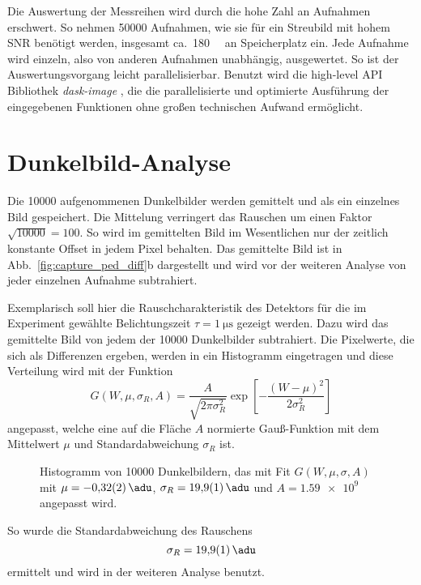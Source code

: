 \noindent
Die Auswertung der Messreihen wird durch die hohe Zahl an Aufnahmen erschwert. So nehmen \num{50000} Aufnahmen, wie sie für ein Streubild mit hohem SNR benötigt werden, insgesamt ca.\ \qty{180}{\giga\byte} an Speicherplatz ein. Jede Aufnahme wird einzeln, also von anderen Aufnahmen unabhängig, ausgewertet. So ist der Auswertungsvorgang leicht parallelisierbar. Benutzt wird die high-level API Bibliothek \textit{dask-image} \cite{dask-library}, die die parallelisierte und optimierte Ausführung der eingegebenen Funktionen ohne großen technischen Aufwand ermöglicht.

\section{Dunkelbild-Analyse}
Die \num{10000} aufgenommenen Dunkelbilder werden gemittelt und als ein einzelnes Bild gespeichert. Die Mittelung verringert das Rauschen um einen Faktor $\sqrt{10000} = 100$. So wird im gemittelten Bild im Wesentlichen nur der zeitlich konstante Offset in jedem Pixel behalten. Das gemittelte Bild ist in Abb.~\ref{fig:capture_ped_diff}b dargestellt und wird vor der weiteren Analyse von jeder einzelnen Aufnahme subtrahiert.

\noindent
Exemplarisch soll hier die Rauschcharakteristik des Detektors für die im Experiment gewählte Belichtungszeit $\tau = \SI{1}{\micro\second}$ gezeigt werden. Dazu wird das gemittelte Bild von jedem der \num{10000} Dunkelbilder subtrahiert. Die Pixelwerte, die sich als Differenzen ergeben, werden in ein Histogramm eingetragen und diese Verteilung wird mit der Funktion
\begin{equation}
    G(W, \mu, \sigma_R, A) = \frac{A}{\sqrt{2\pi \sigma_R^2}}\exp\left[-\frac{(W - \mu)^2}{2\sigma_R^2}\right]
    \label{eq:gauss_funktion}
\end{equation}
angepasst, welche eine auf die Fläche $A$ normierte Gauß-Funktion mit dem Mittelwert $\mu$ und Standardabweichung $\sigma_R$ ist.
\begin{figure}[H]
    \centering
    
    \caption{Histogramm von \num{10000} Dunkelbildern, das mit Fit $G(W,\mu,\sigma, A)$ mit $\mu= \SI{-0.32(2)}{\adu}$, $\sigma_R = \SI{19.9(1)}{\adu}$ und $A = \num{1.59e9}$ angepasst wird.}
    \label{fig:noise_hist_fit}
\end{figure}
\noindent
So wurde die Standardabweichung des Rauschens
\begin{equation}
    \sigma_R = \SI{19.9(1)}{\adu}
    \label{eq:sigma_r}
\end{equation}
ermittelt und wird in der weiteren Analyse benutzt.

